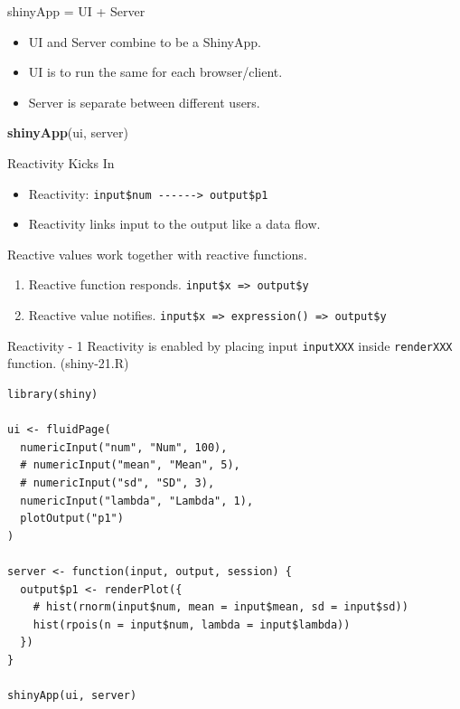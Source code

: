 \documentclass[
  10pt,
  ignorenonframetext,
  serif]{beamer}
\newenvironment{Shaded}{\begin{snugshade}}{\end{snugshade}}
\newcommand{\KeywordTok}[1]{\textcolor[rgb]{0.13,0.29,0.53}{\textbf{#1}}}
\newcommand{\NormalTok}[1]{#1}
\providecommand{\tightlist}{%
  \setlength{\itemsep}{0pt}\setlength{\parskip}{0pt}}
\begin{document}
\begin{frame}[fragile]{shinyApp = UI + Server}
\protect\hypertarget{shinyapp-ui-server}{}
\begin{itemize}
\tightlist
\item
  UI and Server combine to be a ShinyApp.
\item
  UI is to run the same for each browser/client.
\item
  Server is separate between different users.
\end{itemize}

\begin{Shaded}
\begin{Highlighting}[]
\KeywordTok{shinyApp}\NormalTok{(ui, server)}
\end{Highlighting}
\end{Shaded}
\end{frame}

\begin{frame}[fragile]{Reactivity Kicks In}
\protect\hypertarget{reactivity-kicks-in}{}
\begin{itemize}
\tightlist
\item
  Reactivity:
  \texttt{input\$num\ -\/-\/-\/-\/-\/-\textgreater{}\ output\$p1}
\item
  Reactivity links input to the output like a data flow.
\end{itemize}

Reactive values work together with reactive functions.

\begin{enumerate}
\tightlist
\item
  Reactive function responds.
  \texttt{input\$x\ =\textgreater{}\ output\$y}
\item
  Reactive value notifies.
  \texttt{input\$x\ =\textgreater{}\ expression()\ =\textgreater{}\ output\$y}
\end{enumerate}
\end{frame}

\begin{frame}[fragile]{Reactivity - 1}
\protect\hypertarget{reactivity---1}{}
Reactivity is enabled by placing input \texttt{inputXXX} inside
\texttt{renderXXX} function. (shiny-21.R)

\begin{verbatim}
library(shiny)

ui <- fluidPage(
  numericInput("num", "Num", 100),
  # numericInput("mean", "Mean", 5),
  # numericInput("sd", "SD", 3),
  numericInput("lambda", "Lambda", 1),
  plotOutput("p1")
)

server <- function(input, output, session) {
  output$p1 <- renderPlot({
    # hist(rnorm(input$num, mean = input$mean, sd = input$sd))
    hist(rpois(n = input$num, lambda = input$lambda))
  })
}

shinyApp(ui, server)
\end{verbatim}
\end{frame}
\end{document}
